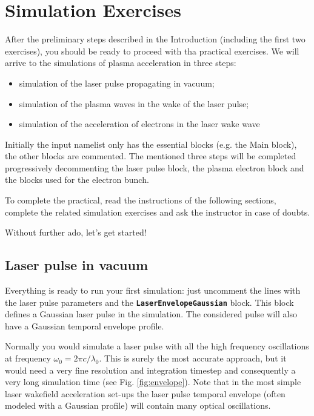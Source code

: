 \documentclass[a4paper,12pt]{extarticle}
\newcommand{\commandline}[1]{\texttt{\textbf{#1}}}
\begin{document}
\section{Simulation Exercises}
After the preliminary steps described in the Introduction (including the first two exercises), you should be ready to proceed with tha practical exercises.  We will arrive to the simulations of plasma acceleration in three steps:
\begin{itemize}
\item simulation of the laser pulse propagating in vacuum;
\item simulation of the plasma waves in the wake of the laser pulse;
\item simulation of the acceleration of electrons in the laser wake wave
\end{itemize}

Initially the input namelist only has the essential blocks (e.g.  the Main block),  the other blocks are commented. The mentioned three steps will be completed progressively decommenting the laser pulse block, the plasma electron block and the blocks used for the electron bunch.

To complete the practical, read the instructions of the following sections, complete the related simulation exercises and ask the instructor in case of doubts. 

Without further ado, let's get started!

\subsection{Laser pulse in vacuum}
Everything is ready to run your first simulation: just uncomment the lines with the laser pulse parameters and the \commandline{LaserEnvelopeGaussian} block. This block defines a Gaussian laser pulse in the simulation. The considered pulse will also have a Gaussian temporal envelope profile.

Normally you would simulate a laser pulse with all the high frequency oscillations at frequency $\omega_0=2\pi c/\lambda_0$. This is surely the most accurate approach, but it would need a very fine resolution and integration timestep and consequently a very long simulation time (see Fig. \ref{fig:envelope}). Note that in the most simple laser wakefield acceleration set-ups the laser pulse temporal envelope (often modeled with a Gaussian profile) will contain many optical oscillations.
\end{document}
